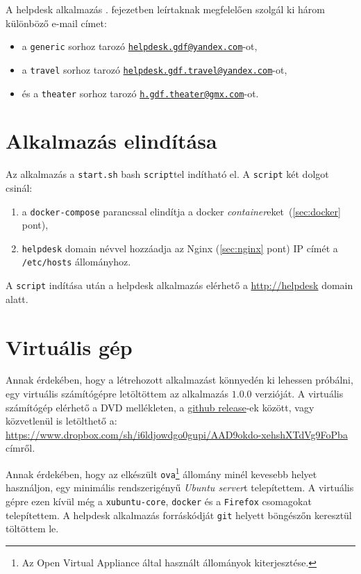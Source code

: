 A helpdesk alkalmazás . fejezetben leírtaknak megfelelően szolgál ki három különböző e-mail címet:

\begin{itemize}
	\item a \texttt{generic} sorhoz tarozó  \href{mailto:helpdesk.gdf@yandex.com}{\nolinkurl{helpdesk.gdf@yandex.com}}-ot, 
	\item a \texttt{travel} sorhoz tarozó  \href{mailto:helpdesk.gdf.travel@yandex.com}{\nolinkurl{helpdesk.gdf.travel@yandex.com}}-ot,
	\item és a \texttt{theater} sorhoz tarozó  \href{mailto:h.gdf.theater@gmx.com}{\nolinkurl{h.gdf.theater@gmx.com}}-ot.
\end{itemize}



\section{Alkalmazás elindítása}\label{sec:elinditas}
Az alkalmazás a \texttt{start.sh} bash \texttt{script}tel indítható el. A \texttt{script} két dolgot csinál:
\begin{enumerate}
	\item a \texttt{docker-compose} parancssal elindítja a docker \emph{container}eket~(\ref{sec:docker} pont),
	\item  \texttt{helpdesk} domain névvel hozzáadja az Nginx (\ref{sec:nginx} pont) IP címét a \mbox{\texttt{/etc/hosts}} állományhoz.
\end{enumerate}

A \texttt{script} indítása után a helpdesk alkalmazás elérhető a \href{http://helpdesk}{http://helpdesk} domain alatt.

\section{Virtuális gép}
Annak érdekében, hogy a létrehozott alkalmazást könnyedén ki lehessen próbálni, egy virtuális számítógépre letöltöttem az alkalmazás $1.0.0$ verzióját. A virtuális számítógép elérhető a DVD mellékleten, a \href{https://github.com/balazsBole/szakdolgozat/releases/}{github release}-ek között, vagy közvetlenül is letölthető a: \\
\href{https://www.dropbox.com/sh/i6ldjowdgo0gupi/AAD9okdo-xehshXTdVg9FoPba?dl=1}{https://www.dropbox.com/sh/i6ldjowdgo0gupi/AAD9okdo-xehshXTdVg9FoPba} címről.

Annak érdekében, hogy az elkészült \texttt{ova}\footnote{Az Open Virtual Appliance által használt állományok kiterjesztése.} állomány minél kevesebb helyet használjon, egy minimális rendszerigényű \emph{Ubuntu server}t telepítettem. A virtuális gépre ezen kívül még a \texttt{xubuntu-core}, \texttt{docker} és a \texttt{Firefox} csomagokat telepítettem. A helpdesk alkalmazás forráskódját \texttt{git} helyett böngészőn keresztül töltöttem le.


